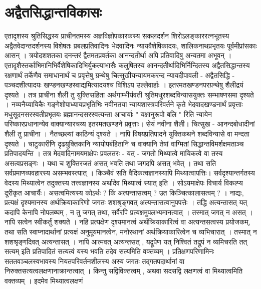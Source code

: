 \section{अद्वैतसिद्धान्तविकासः}
 एतादृशस्य श्रुतिसिद्धस्य प्राचीनतमस्य अज्ञविज्ञोपकारकस्य सकलदर्शन शिरोऽलङ्काररत्नभूतस्य अद्वैतवेदान्तदर्शनस्य विशेषतः प्रबलप्रतिवादिनः भेदवादिनः न्यायवैशेषिकादयः, शालिकनाथप्रभृतयः पूर्वमीप्रांसकाः आसन् । त्रयोदशशतका दनन्तरं द्वैतमतप्रवर्तका आनन्दतीर्था अपि प्रतिवादिषु अन्यतमा अभूवन् । एतादृशैस्तर्काभिमानिभिर्वैशेषिकादिभिर्युकत्याभासैः कलुषितस्य आनन्दतीर्थादिभिर्निन्दितस्य अद्वैतसिद्धान्तस्य रक्षणार्थं तर्केणैव समाधानार्थं च प्रवृत्तेषु ग्रन्थेषु चित्सुखीयन्यायमकरन्द न्यायदीपावली - अद्वैतसिद्धि - पञ्चदशीत्यादयः खण्डनखण्डस्वाद्यमित्यादयश्च विशिऽय उल्लेवार्हाः । इतरमतखण्डनपरग्रन्थेषु शैलीद्रयं दृश्यते । तत्र प्राचीना शैली तु युक्तिसहिता अर्थगाम्भीर्यवती श्रुतिमधुरशब्दविन्यासयुक्तः सम्भाषणसमा दृश्यते । नव्यनैय्यायिकैः गङ्गेशोपाध्यायप्रभृतिभिः नवीनतया न्यायशास्त्रपरिवर्तने कृते भेदवादखण्डनार्थं प्रवृत्ताः मधुसूदनसरस्वतीप्रभृतयः ब्रह्मानन्दसरस्वत्यन्ता आचार्याः " यक्षानुरूपो बलि " रिति न्यायेन परिष्कारप्रधानान्येव  वाक्यान्यारचय्य इतरमतखण्डने प्रवृत्ताः। सेयं नवीना शैली। चित्सुख - आनन्दबोधादीनां शैली तु प्राचीना । नैतच्छल्यां काठिन्यं दृश्यते । नापि विषयप्रतिपादने युक्तिकथने शब्दविन्यासे वा मन्दता दृश्यते । चाटुकारीणि दृढयुक्तिकानि न्यायोपबंहितानि च वाक्यानि तेषां वाग्मितां सिद्धान्तविमर्शक्षमताञ्च प्रतिपादयन्ति । तत्र मेदवादिनामयमाक्षेपः प्रवलतरः - यत् - जगतो मिथ्यात्वे मायिकत्वे वा तस्य असत्वप्रसङ्गः । यथा च शुक्तिरजतं असत् भवति तथा जगदपि असत् भवेत् । तथा सति सर्वप्रमाणव्यवहारस्य असम्भवस्त्यात् । किञ्चैवं सति वैदिकत्वज्ञानस्यापि मिथ्यात्वापत्तिः। सर्वदृश्यान्तर्गतस्य वेदस्य मिथ्यात्वेन तदुक्तस्य तत्त्वज्ञानस्य अर्थादेव मिथ्यात्वं स्यात् इति । सोऽयमाक्षेपः विचार्य विकल्प्य दूरीकृत आचार्यैः। असत्वमित्यस्य कोऽर्थः ? किं अत्यन्तासत्वम् ? उत किञ्चित्कालासत्वम् ? । नाद्यः, प्रत्यक्षं दृश्यमानस्य अर्थक्रियाकारिणो जगतः शशश्रृङ्गवत् अत्यन्तासत्वानुपपत्तेः । तद्धि अत्यन्तासत् यत् कदापि केनापि नोपलब्घम् , न तु जगत् तथा, सर्वैरपि प्रत्यक्षमुपलभ्यमानत्वात् । तस्मात् जगत् न असत् । नापि सत्वेन स्वीकर्तुं शक्यते । नहि प्रत्यक्षेण दृश्यमानत्वं अर्थक्रियाकारित्वं वा अत्यन्तसत्वस्य प्रयोजकम्, तथा सति स्वाप्नादार्थानां प्रत्यक्षं अनुमूयमानत्वेन, मनोरथानां अर्थक्रियाकारित्वेन च व्यभिचारात् । तस्मात् न शशश्रृङ्गदिवत् अत्यन्तासत् । नापि आत्मवत् अत्यन्तसत् , यद्रूपेण यत् निश्वितं तद्रूपं न व्यमिचरति तत् सत्यम् इति प्रतिपादितं सत्यत्वं यस्य भवति तदेव सत्यमिति वक्तव्यम् । प्रतिक्षणपरिणामिनः सततवञ्चलस्वभावस्य नियतपरिवर्तनशीलस्य अस्य जगतः तद्गतपदार्थानां वा निरुक्तसत्यत्वलक्षणानाक्रान्तत्वात् । किन्तु सद्विविक्तत्वम् , अथवा सदसद्वि लक्षणत्वं वा मिथ्यात्वमिति वक्तव्यम् । इदमेव मिथ्यात्वलक्षणं
